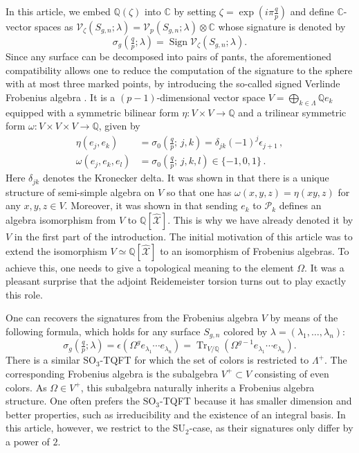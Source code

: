 \documentclass{amsart}
\newcommand{\Q}{\mathbb{Q}}
\newcommand{\C}{\mathbb{C}}
\newcommand{\calV}{\mathcal{V}}
\newcommand{\calX}{\mathcal{X}}
\newcommand{\SU}{\mathrm{SU}}
\newcommand{\SO}{\mathrm{SO}}
\DeclareMathOperator{\Tr}{Tr}
\DeclareMathOperator{\Sign}{Sign}
\def\calP{\mathcal{P}}
\theoremstyle{definition}
\begin{document}
In this article, we embed $\Q(\zeta)$ into $\C$ by setting $\zeta=\exp(i\pi \tfrac{q}{p})$ and define $\C$-vector spaces as $\calV_\zeta(S_{g,n};\lambda)=\calV_p(S_{g,n};\lambda)\otimes \C$ whose signature is denoted by
$$\sigma_g (\tfrac{q}{p};\lambda)=\Sign \calV_\zeta(S_{g,n};\lambda).$$ 
Since any surface can be decomposed into pairs of pants, the aforementioned compatibility allows one to reduce the computation of the signature to the sphere with at most three marked points, by introducing the so-called signed Verlinde Frobenius algebra \cite{DM}. It is a $(p-1)$-dimensional vector space $V=\bigoplus_{k\in \Lambda} \Q e_k$ equipped with a symmetric bilinear form $\eta:V\times V\to \Q$ and a trilinear symmetric form $\omega:V\times V\times V\to \Q$, given by 
\begin{align*}
\eta(e_j,e_k)&=\sigma_0(\tfrac{q}{p};\,j,k)=\delta_{jk}(-1)^j\epsilon_{j+1} \,,\\
\omega(e_j,e_k,e_l)&=\sigma_0(\tfrac{q}{p};\,j,k,l)\in \{-1,0,1\}\,.
\end{align*}
Here $\delta_{jk}$ denotes the Kronecker delta.
It was shown in \cite{DM} that there is a unique structure of semi-simple algebra on $V$ so that one has $\omega(x,y,z)=\eta(xy,z)$ for any $x,y,z\in V$. Moreover, it was shown in \cite{S2P} that sending $e_k$ to $\calP_k$ defines an algebra isomorphism from $V$ to $\Q[\hat{\calX}]$. This is why we have already denoted it by $V$ in the first part of the introduction. The initial motivation of this article was to extend the isomorphism $V\simeq \Q[\hat{\calX}]$ to an isomorphism of Frobenius algebras. To achieve this, one needs to give a topological meaning to the element $\Omega$. It was a pleasant surprise that the adjoint Reidemeister torsion turns out to play exactly this role.

One can recovers the signatures from the Frobenius algebra $V$ by means of the following formula, which holds for any surface $S_{g,n}$ colored by $\lambda=(\lambda_1,\ldots,\lambda_n)$:
$$ \sigma_g(\tfrac{q}{p};\lambda)=\epsilon(\Omega^g e_{\lambda_1}\cdots e_{\lambda_n})=\Tr_{V/\Q}(\Omega^{g-1}e_{\lambda_1}\cdots e_{\lambda_n}).$$
There is a similar $\SO_3$-TQFT for which the set of colors is restricted to $\Lambda^+$. The corresponding Frobenius algebra is the subalgebra $V^+\subset V$ consisting of even colors. As $\Omega\in V^+$, this subalgebra naturally inherits a Frobenius algebra structure. One often prefers the $\SO_3$-TQFT because it has smaller dimension and better properties, such as irreducibility and the existence of an integral basis. In this article, however, we restrict to the $\SU_2$-case, as their signatures only differ by a power of $2$.  
\end{document}
